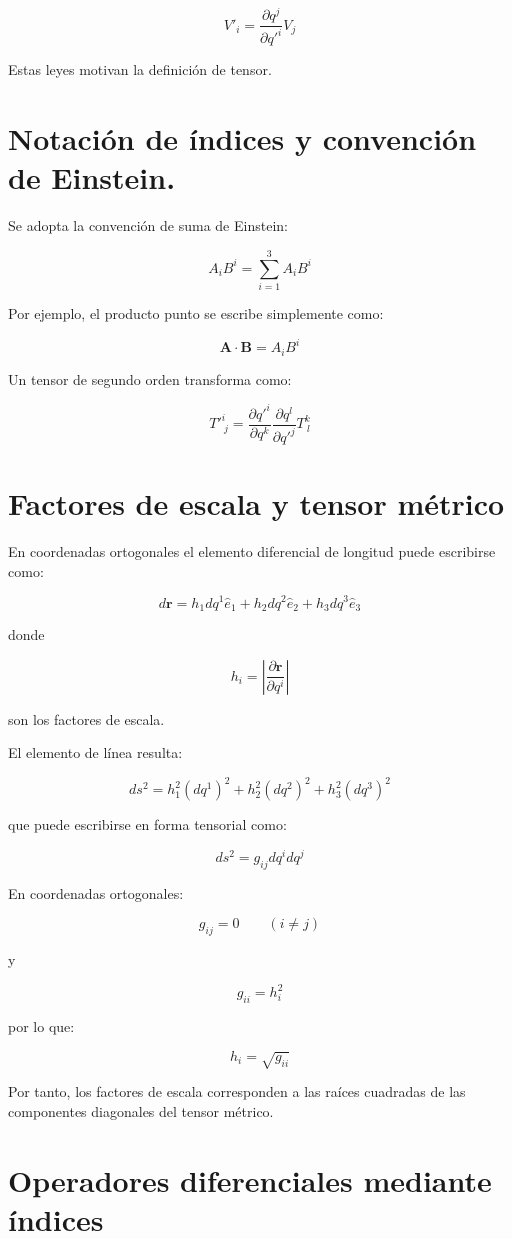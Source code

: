 \documentclass[12pt]{article}
\begin{document}
\[
V'_i=
\frac{\partial q^j}{\partial q'^i}V_j
\]

Estas leyes motivan la definición de tensor.

\section{Notación de índices y convención de Einstein.}

Se adopta la convención de suma de Einstein:

\[
A_iB^i=
\sum_{i=1}^{3}A_iB^i
\]

Por ejemplo, el producto punto se escribe simplemente como:

\[
\mathbf{A}\cdot\mathbf{B}=A_iB^i
\]

Un tensor de segundo orden transforma como:

\[
T'^i_{\ j}
=
\frac{\partial q'^i}{\partial q^k}
\frac{\partial q^l}{\partial q'^j}
T^k_{\ l}
\]

\section{Factores de escala y tensor métrico}

En coordenadas ortogonales el elemento diferencial de longitud puede escribirse como:

\[
d\mathbf{r}
=
h_1dq^1\hat{e}_1+
h_2dq^2\hat{e}_2+
h_3dq^3\hat{e}_3
\]

donde

\[
h_i=
\left|
\frac{\partial \mathbf{r}}
{\partial q^i}
\right|
\]

son los factores de escala.

El elemento de línea resulta:

\[
ds^2=
h_1^2(dq^1)^2+
h_2^2(dq^2)^2+
h_3^2(dq^3)^2
\]

que puede escribirse en forma tensorial como:

\[
ds^2=
g_{ij}dq^idq^j
\]

En coordenadas ortogonales:

\[
g_{ij}=0
\qquad
(i\neq j)
\]

y

\[
g_{ii}=h_i^2
\]

por lo que:

\[
h_i=\sqrt{g_{ii}}
\]

Por tanto, los factores de escala corresponden a las raíces cuadradas de las componentes diagonales del tensor métrico.

\section{Operadores diferenciales mediante índices}
\end{document}
